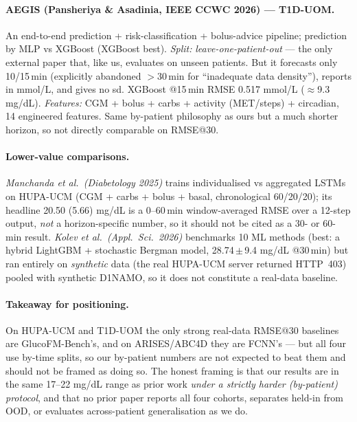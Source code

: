 \documentclass[10pt,letterpaper]{article}
\begin{document}
\paragraph{AEGIS (Pansheriya \& Asadinia, IEEE CCWC 2026) --- T1D-UOM.} An
end-to-end prediction + risk-classification + bolus-advice pipeline; prediction by
MLP vs XGBoost (XGBoost best). \emph{Split:} \emph{leave-one-patient-out} --- the
only external paper that, like us, evaluates on unseen patients. But it forecasts
only 10/15\,min (explicitly abandoned $>$30\,min for ``inadequate data density''),
reports in mmol/L, and gives no sd. XGBoost @15\,min RMSE 0.517 mmol/L
($\approx$9.3 mg/dL). \emph{Features:} CGM + bolus + carbs + activity (MET/steps)
+ circadian, 14 engineered features. Same by-patient philosophy as ours but a much
shorter horizon, so not directly comparable on RMSE@30.

\paragraph{Lower-value comparisons.} \emph{Manchanda et al.\ (Diabetology 2025)}
trains individualised vs aggregated LSTMs on HUPA-UCM (CGM + carbs + bolus + basal,
chronological 60/20/20); its headline 20.50 (5.66) mg/dL is a 0--60\,min
window-averaged RMSE over a 12-step output, \emph{not} a horizon-specific number,
so it should not be cited as a 30- or 60-min result. \emph{Kolev et al.\ (Appl.\
Sci.\ 2026)} benchmarks 10 ML methods (best: a hybrid LightGBM + stochastic Bergman
model, 28.74\,$\pm$\,9.4 mg/dL @30\,min) but ran entirely on \emph{synthetic} data
(the real HUPA-UCM server returned HTTP~403) pooled with synthetic D1NAMO, so it
does not constitute a real-data baseline.

\paragraph{Takeaway for positioning.} On HUPA-UCM and T1D-UOM the only strong
real-data RMSE@30 baselines are GlucoFM-Bench's, and on ARISES/ABC4D they are
FCNN's --- but all four use by-time splits, so our by-patient numbers are not
expected to beat them and should not be framed as doing so. The honest framing is
that our results are in the same 17--22 mg/dL range as prior work \emph{under a
strictly harder (by-patient) protocol}, and that no prior paper reports all four
cohorts, separates held-in from OOD, or evaluates across-patient generalisation as
we do.



\end{document}
